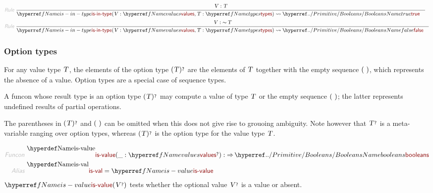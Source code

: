 \begin{align*}
  \KEY{Rule} ~ 
    & \RULE{
       \VAR{V} : \VAR{T}
      }{
      & \NAMEREF{is-in-type}
          ( \VAR{V} : \NAMEREF{values},   
            \VAR{T} : \NAMEREF{types} ) \leadsto
          \NAMEHYPER{../Primitive}{Booleans}{true}
      }
\\
  \KEY{Rule} ~ 
    & \RULE{
       \VAR{V} : \mathop{\sim} \VAR{T}
      }{
      & \NAMEREF{is-in-type}
          ( \VAR{V} : \NAMEREF{values},   
            \VAR{T} : \NAMEREF{types} ) \leadsto
          \NAMEHYPER{../Primitive}{Booleans}{false}
      }
\end{align*}
\subsubsection*{Option types}\hypertarget{option-types}{}\label{option-types}

For any value type $\SHADE{\VAR{T}}$, the elements of the option type $\SHADE{( \VAR{T} )\QUERY}$ are the
  elements of $\SHADE{\VAR{T}}$ together with the empty sequence $\strut(  ~  )\strut$, which represents
  the absence of a value. Option types are a special case of sequence types.

A funcon whose result type is an option type $\SHADE{( \VAR{T} )\QUERY}$ may compute a value of
  type $\SHADE{\VAR{T}}$ or the empty sequence $\strut(  ~  )\strut$; the latter represents undefined results
  of partial operations.

The parentheses in $\SHADE{( \VAR{T} )\QUERY}$ and $\strut(  ~  )\strut$ can be omitted when this does not give
  rise to grouoing ambiguity. Note however that $\SHADE{\VAR{T}\QUERY}$ is a meta-variable ranging
  over option types, whereas $\SHADE{( \VAR{T} )\QUERY}$ is the option type for the value type $\SHADE{\VAR{T}}$.

\begin{align*}
  \KEY{Funcon} ~ 
  & \NAMEDECL{is-value}(\_ : \NAMEREF{values}\QUERY) :  \TO \NAMEHYPER{../Primitive}{Booleans}{booleans}
\\
  \KEY{Alias} ~ 
  & \NAMEDECL{is-val} = \NAMEREF{is-value}
\end{align*}
$\SHADE{\NAMEREF{is-value}
           ( \VAR{V}\QUERY )}$ tests whether the optional value $\SHADE{\VAR{V}\QUERY}$ is a value or absent.

